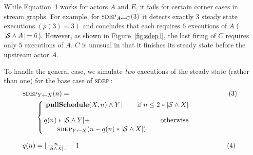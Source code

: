 While Equation~1 works for actors $A$ and $E$, it fails for certain
corner cases in stream graphs.  For example, for $\textsc{sdep}_{A \small{\leftarrow} C}(3)$ it
detects exactly 3 steady state executions $(p(3)=3)$ and concludes
that each requires $6$ executions of $A$ ($|{\cal S} \wedge A| = 6$).
However, as shown in Figure~\ref{fig:sdep1}, the last firing of
$C$ requires only $5$ executions of $A$.  $C$ is unusual in that it
finishes its steady state before the upstream actor $A$.

To handle the general case, we simulate {\it two} executions of the
steady state (rather than one) for the base case of $\textsc{sdep}$:
\begin{equation*}
\hspace{20pt}\begin{array}{l}
\hspace{-10pt}\sdepf{Y}{X}(n) = ~\hspace{3.1in}\hspace{4pt}(3)\\[1Ex]
\mbox{~}\hspace{6pt}
\left\{\begin{array}{lr}
\hspace{-3.5pt}|{\bf pullSchedule}(X, n) \wedge Y| & \hspace{-23pt} \mbox{if~} n \le 2*|{\cal S} \wedge X| \\[2.5Ex]
\hspace{-3.5pt}q(n) * |{\cal S} \wedge Y| + & \hspace{-23pt} \mbox{otherwise} \\[0.2Ex] %
\mbox{~}\hspace{12.5pt} \sdepf{Y}{X}(n - q(n) * |{\cal S} \wedge X|)
\end{array}
\right.~\\~\\
\hspace{-10pt}q(n) = \lfloor \frac{n}{|{\cal S} \wedge X|} \rfloor - 1  ~\hspace{2.93in}\hspace{2pt}(4)
\end{array}
\vspace{-2pt}
\end{equation*}
